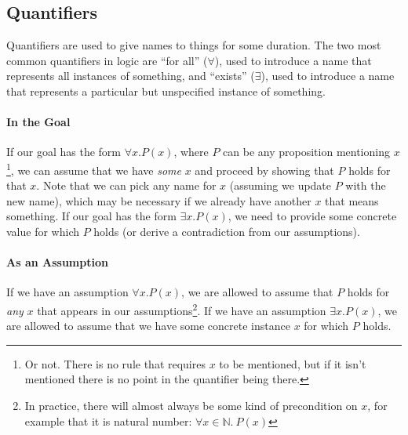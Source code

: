 \documentclass{tufte-handout}
\newcounter{example}
\begin{document}
\subsection{Quantifiers}

Quantifiers are used to give names to things for some duration.
The two most common quantifiers in logic are ``for all''
($\forall$), used to introduce a name that represents all
instances of something, and ``exists'' ($\exists$), used to
introduce a name that represents a particular but unspecified
instance of something.

\paragraph{In the Goal}
If our goal has the form $\forall x. P(x)$, where $P$ can be any
proposition mentioning $x$\footnote{Or not. There is no rule that
  requires $x$ to be mentioned, but if it isn't mentioned there is
  no point in the quantifier being there.}, we can assume that we
have \emph{some} $x$ and proceed by showing that $P$ holds for
that $x$. Note that we can pick any name for $x$ (assuming we
update $P$ with the new name), which may be necessary if we
already have another $x$ that means something.
%
If our goal has the form $\exists x. P(x)$, we need to provide
some concrete value for which $P$ holds (or derive a contradiction
from our assumptions).

\paragraph{As an Assumption}
If we have an assumption $\forall x. P(x)$, we are allowed to
assume that $P$ holds for \emph{any} $x$ that appears in our
assumptions\footnote{In practice, there will almost always be some
  kind of precondition on $x$, for example that it is natural
  number: $\forall x\in\mathbb{N}.~P(x)$}.
%
If we have an assumption $\exists x. P(x)$, we are allowed to
assume that we have some concrete instance $x$ for which $P$
holds.
\end{document}
